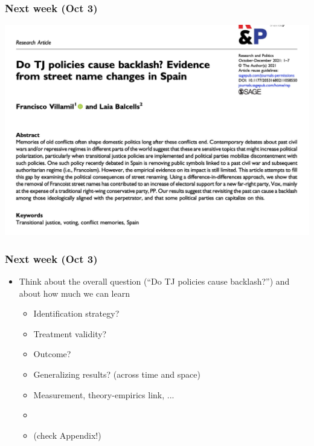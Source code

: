 \documentclass[aspectratio=43]{beamer}
\begin{document}
\begin{frame}
\frametitle{Next week (Oct 3)}
\centering

\includegraphics[width = \textwidth]{../img/villamilbalcells}

\end{frame}

\begin{frame}
\frametitle{Next week (Oct 3)}
\centering

\begin{itemize}
  \item Think about the overall question (``Do TJ policies cause backlash?'') and about how much we can learn
  \begin{itemize}
    \item Identification strategy?
    \item Treatment validity?
    \item Outcome?
    \item Generalizing results? (across time and space)
    \item Measurement, theory-empirics link, ...
    \item[]
    \item[] (check Appendix!)
  \end{itemize}
\end{itemize}

\end{frame}


\end{document}
